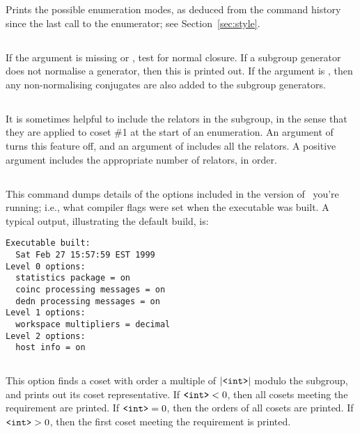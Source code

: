 Prints the possible enumeration modes, as deduced from the command history
  since the last call to the enumerator; see Section~\ref{sec:style}.

\subsection{}

If the argument is missing or , test for normal closure.
If a subgroup generator does not normalise a generator, then this is
  printed out.
If the argument is , then any non-normalising conjugates are
  also added to the subgroup generators.

\subsection{}

It is sometimes helpful to include the relators in the subgroup, in the
  sense that they are applied to coset \#1 at the start of an enumeration.
An argument of  turns this feature off, and an argument of 
  includes all the relators.
A positive argument includes the appropriate number of relators, in order.

\subsection{}

This command dumps details of the options included in the version of \ace\
  you're running; i.e., what compiler flags were set when the executable
  was built.
A typical output, illustrating the default build, is:

\bv\begin{verbatim}
Executable built:
  Sat Feb 27 15:57:59 EST 1999
Level 0 options:
  statistics package = on
  coinc processing messages = on
  dedn processing messages = on
Level 1 options:
  workspace multipliers = decimal
Level 2 options:
  host info = on
\end{verbatim}\ev

\subsection{}

This option finds a coset with order a multiple of $|\texttt{<int>}|$ modulo
  the subgroup, and prints out its coset representative.
If $\texttt{<int>} < 0$, then all cosets meeting the requirement are printed.
If $\texttt{<int>} = 0$, then the orders of all cosets are printed.
If $\texttt{<int>} > 0$, then the first coset meeting the requirement is
  printed.


